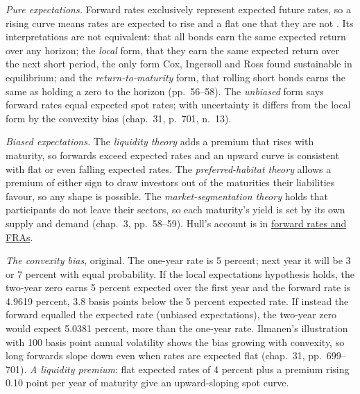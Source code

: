 \begin{qfresult}\label{res:term-structure-theories}
 \emph{Pure expectations.} Forward rates exclusively represent expected future rates, so a rising curve means rates are expected to rise and a flat one that they are not \citep[chap.~3, p.~55]{s7-fabozzifixed}. Its interpretations are not equivalent: that all bonds earn the same expected return over any horizon; the \emph{local} form, that they earn the same expected return over the next short period, the only form Cox, Ingersoll and Ross found sustainable in equilibrium; and the \emph{return-to-maturity} form, that rolling short bonds earns the same as holding a zero to the horizon (pp.~56--58). The \emph{unbiased} form says forward rates equal expected spot rates; with uncertainty it differs from the local form by the convexity bias (chap.~31, p.~701, n.~13).

\emph{Biased expectations.} The \emph{liquidity theory} adds a premium that rises with maturity, so forwards exceed expected rates and an upward curve is consistent with flat or even falling expected rates. The \emph{preferred-habitat theory} allows a premium of either sign to draw investors out of the maturities their liabilities favour, so any shape is possible. The \emph{market-segmentation theory} holds that participants do not leave their sectors, so each maturity's yield is set by its own supply and demand (chap.~3, pp.~58--59). Hull's account is in \hyperref[mod:forward-rates-fra]{forward rates and FRAs}.

 \emph{The convexity bias}, original. The one-year rate is 5 percent; next year it will be 3 or 7 percent with equal probability. If the local expectations hypothesis holds, the two-year zero earns 5 percent expected over the first year and the forward rate is 4.9619 percent, 3.8 basis points below the 5 percent expected rate. If instead the forward equalled the expected rate (unbiased expectations), the two-year zero would expect 5.0381 percent, more than the one-year rate. Ilmanen's illustration with 100 basis point annual volatility shows the bias growing with convexity, so long forwards slope down even when rates are expected flat (chap.~31, pp.~699--701). \emph{A liquidity premium}: flat expected rates of 4 percent plus a premium rising 0.10 point per year of maturity give an upward-sloping spot curve.


\end{qfresult}
